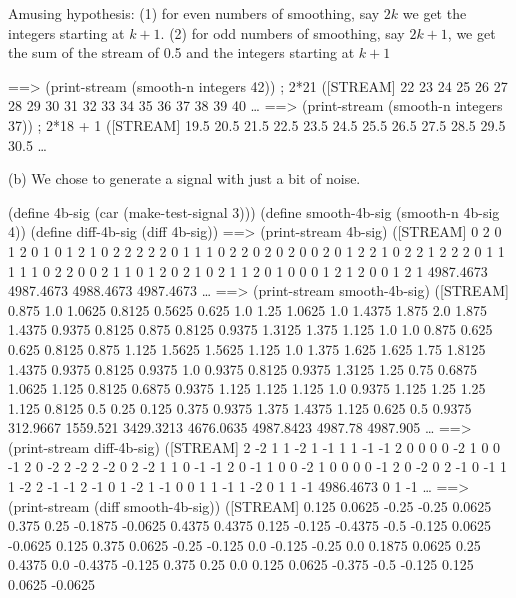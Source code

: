 Amusing hypothesis: (1) for even numbers of smoothing, say $2k$ we get the
integers starting at $k+1$.  (2) for odd numbers of smoothing, say $2k+1$,
we get the sum of the stream of 0.5 and the integers starting at $k+1$

\beginlisp
==> (print-stream (smooth-n integers 42))  ; 2*21
([STREAM] 22 23 24 25 26 27 28 29 30 31 32 33 34 35 36 37 38 39 40 \ldots
==> (print-stream (smooth-n integers 37))   ; 2*18 + 1
([STREAM] 19.5 20.5 21.5 22.5 23.5 24.5 25.5 26.5 27.5 28.5 29.5 30.5 \ldots
\endlisp

\newpage

(b) We chose to generate a signal with just a bit of noise.

\beginlisp
(define        4b-sig (car (make-test-signal 3)))
(define smooth-4b-sig (smooth-n 4b-sig 4))
(define   diff-4b-sig (diff     4b-sig))
\null
==> (print-stream 4b-sig)
([STREAM] 0 2 0 1 2 0 1 0 1 2 1 0 2 2 2 2 2 0 1 1 1 0 2 2 0 2 0 2 0 0 2 0 1 2 2
          1 0 2 2 1 2 2 2 0 1 1 1 1 1 0 2 2 0 0 2 1 1 0 1 2 0 2 1 0 2 1 1 2 0 1
          0 0 0 1 2 1 2 0 0 1 2 1 4987.4673 4987.4673 4988.4673 4987.4673 \ldots
\null
==> (print-stream smooth-4b-sig)
([STREAM] 0.875  1.0    1.0625 0.8125 0.5625 0.625  1.0    1.25   1.0625 1.0
          1.4375 1.875  2.0    1.875  1.4375 0.9375 0.8125 0.875  0.8125 0.9375
          1.3125 1.375  1.125  1.0    1.0    0.875  0.625  0.625  0.8125 0.875
          1.125  1.5625 1.5625 1.125  1.0    1.375  1.625  1.625  1.75   1.8125
          1.4375 0.9375 0.8125 0.9375 1.0    0.9375 0.8125 0.9375 1.3125 1.25
          0.75   0.6875 1.0625 1.125  0.8125 0.6875 0.9375 1.125  1.125  1.125
          1.0    0.9375 1.125  1.25   1.25   1.125  0.8125 0.5    0.25   0.125
          0.375  0.9375 1.375  1.4375 1.125  0.625  0.5    0.9375 312.9667
          1559.521 3429.3213 4676.0635 4987.8423 4987.78 4987.905 \ldots
\null
==> (print-stream diff-4b-sig)
([STREAM]  2 -2  1  1 -2  1 -1  1  1 -1 -1  2  0  0  0  0 -2  1  0  0 -1  2  0
          -2  2 -2  2 -2  0  2 -2  1  1  0 -1 -1  2  0 -1  1  0  0 -2  1  0  0
           0  0 -1  2  0 -2  0  2 -1  0 -1  1  1 -2  2 -1 -1  2 -1  0  1 -2  1
          -1  0  0  1  1 -1  1 -2  0  1  1 -1 4986.4673 0  1 -1 \ldots
\null
==> (print-stream (diff smooth-4b-sig))
([STREAM] 0.125   0.0625 -0.25   -0.25    0.0625  0.375   0.25   -0.1875 -0.0625
          0.4375  0.4375  0.125  -0.125  -0.4375 -0.5    -0.125   0.0625 -0.0625
          0.125   0.375   0.0625 -0.25   -0.125   0.0    -0.125  -0.25    0.0
          0.1875  0.0625  0.25    0.4375  0.0    -0.4375 -0.125   0.375   0.25
          0.0     0.125   0.0625 -0.375  -0.5    -0.125   0.125   0.0625 -0.0625
